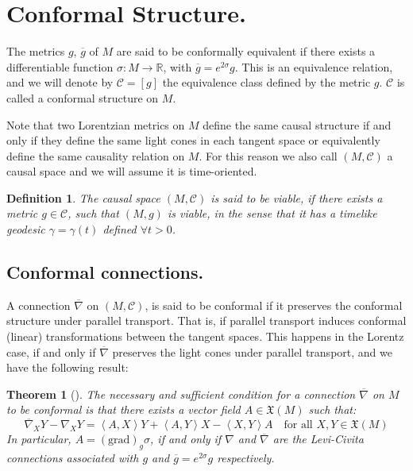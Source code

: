 \documentclass{amsart}%
\newtheorem{theorem}{Theorem}
\theoremstyle{plain}
\newtheorem{definition}{Definition}
\numberwithin{equation}{section}
\begin{document}
\section{Conformal Structure.}

The metrics $g$, $\overline{g}$ of $M$ are said to be conformally equivalent
if there exists a differentiable function $\sigma:M\longrightarrow\mathbb{R}$,
with $\overline{g}=e^{2\sigma}g$. This is an equivalence relation, and we will
denote by $\mathcal{C}=[g]$ the equivalence class defined by the metric $g$.
$\mathcal{C}$ is called a conformal structure on $M$.

Note that two Lorentzian metrics on $M$ define the same causal structure if
and only if they define the same light cones in each tangent space or
equivalently define the same causality relation on $M$. For this reason we
also call $\left(  M,\mathcal{C}\right)  $ a causal space and we will assume
it is time-oriented.

\begin{definition}
\label{viable} The causal space $\left(  M,\mathcal{C}\right)  $ is said to be
viable, if there exists a metric $g\in\mathcal{C}$, such that $\left(
M,g\right)  $ is viable, in the sense that it has a timelike geodesic
$\gamma=\gamma\left(  t\right)  $ defined $\forall t>0$.
\end{definition}

\subsection{Conformal connections.}

A connection $\overline{\nabla}$ on $\left(  M,\mathcal{C}\right)  $, is said
to be conformal if it preserves the conformal structure under parallel
transport. That is, if parallel transport induces conformal (linear)
transformations between the tangent spaces. This happens in the Lorentz case,
if and only if $\overline{\nabla}$ preserves the light cones under parallel
transport, and we have the following result:

\begin{theorem}
[\cite{Kul1}]\label{0.3.1}The necessary and sufficient condition for a
connection $\overline{\nabla}$ on $M$ to be conformal is that there exists a
vector field $A\in\mathfrak{X}(M)$ such that:
\begin{equation}
\overline{\nabla}_{X}Y-\nabla_{X}Y=\left\langle A,X\right\rangle
Y+\left\langle A,Y\right\rangle X-\left\langle X,Y\right\rangle A\quad
\text{for all }X,Y\in\mathfrak{X}(M) \label{concon}%
\end{equation}
In particular, $A=(\mathrm{grad})_{g}\sigma$, if and only if $\nabla$ and
$\overline{\nabla}$ are the Levi-Civita connections associated with $g$ and
$\overline{g}=e^{2\sigma}g$ respectively.
\end{theorem}
\end{document}
